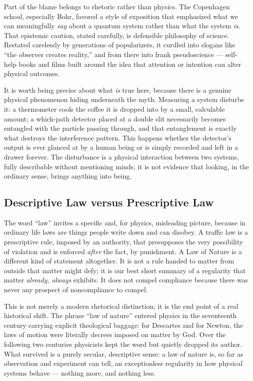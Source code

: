Part of the blame belongs to rhetoric rather than physics. The Copenhagen
school, especially Bohr, favored a style of exposition that emphasized what
we can meaningfully \emph{say} about a quantum system rather than what the
system \emph{is}. That epistemic caution, stated carefully, is defensible
philosophy of science. Restated carelessly by generations of popularizers,
it curdled into slogans like ``the observer creates reality,'' and from
there into frank pseudoscience --- self-help books and films built around
the idea that attention or intention can alter physical outcomes.

It is worth being precise about what \emph{is} true here, because there is
a genuine physical phenomenon hiding underneath the myth. Measuring a
system disturbs it: a thermometer cools the coffee it is dropped into by a
small, calculable amount; a which-path detector placed at a double slit
necessarily becomes entangled with the particle passing through, and that
entanglement is exactly what destroys the interference pattern. This
happens whether the detector's output is ever glanced at by a human being
or is simply recorded and left in a drawer forever. The disturbance is a
physical interaction between two systems, fully describable without
mentioning minds; it is not evidence that looking, in the ordinary sense,
brings anything into being.

\subsection{Descriptive Law versus Prescriptive Law}

The word ``law'' invites a specific and, for physics, misleading picture,
because in ordinary life laws are things people write down and can
disobey. A traffic law is a prescriptive rule, imposed by an authority,
that presupposes the very possibility of violation and is enforced
\emph{after} the fact, by punishment. A Law of Nature is a different kind
of statement altogether. It is not a rule handed to matter from outside
that matter might defy; it is our best short summary of a regularity that
matter \emph{already, always} exhibits. It does not compel compliance
because there was never any prospect of noncompliance to compel.

This is not merely a modern rhetorical distinction; it is the end point of
a real historical shift. The phrase ``law of nature'' entered physics in
the seventeenth century carrying explicit theological baggage: for
Descartes and for Newton, the laws of motion were literally decrees
imposed on matter by God. Over the following two centuries physicists kept
the word but quietly dropped its author. What survived is a purely
secular, descriptive sense: a law of nature is, so far as observation and
experiment can tell, an exceptionless regularity in how physical systems
behave --- nothing more, and nothing less.

